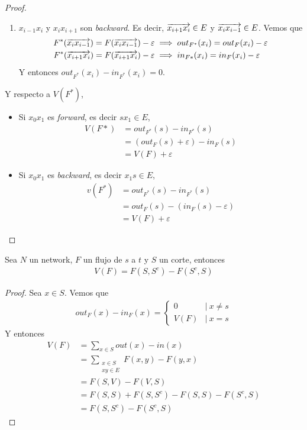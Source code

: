 \begin{proof}
\begin{itemize}
\begin{enumerate}
    \item $x_{i-1}x_i$ y $x_ix_{i+1}$ son \emph{backward}. Es decir,
      $\overrightarrow{x_{i+1} x_i} \in E$ y $\overrightarrow{x_i x_{i-1}} \in E$. Vemos que
      \begin{align}
        F^*(\overrightarrow{x_i x_{i-1}}) = F(\overrightarrow{x_i x_{i-1}}) - \varepsilon
        &\implies out_{F^*}(x_i) = out_F(x_i) - \varepsilon\\
        F^*(\overrightarrow{x_{i+1} x_i}) = F(\overrightarrow{x_{i+1} x_i}) - \varepsilon
        &\implies in_{F*} (x_i) = in_F(x_i) - \varepsilon
      \end{align}
      Y entonces $out_{F^*} (x_i) - in_{F^*}(x_i) = 0$.
    \end{enumerate}
  \end{itemize}

  Y respecto a $V(F^*)$,
  \begin{itemize}
    \item[] Si $x_0x_1$ es \emph{forward}, es decir $sx_1 \in E$,
    \begin{align}
      V(F*)
      &= out_{F^*}(s) - in_{F^*}(s)\\
      &= (out_F(s) + \varepsilon) - in_{F}(s)\\
      &= V(F) + \varepsilon
    \end{align}

    \item[] Si $x_0x_1$ es \emph{backward}, es decir $x_1s \in E$,
    \begin{align}
      v(F^*)
      &= out_{F^*}(s) - in_{F^*}(s)\\
      &= out_F(s) - (in_F(s) - \varepsilon)\\
      &= V(F) + \varepsilon
    \end{align}
  \end{itemize}
\end{proof}

\begin{lemma}
  Sea $N$ un network, $F$ un flujo de $s$ a $t$ y $S$ un corte, entonces
  \begin{align}
    V(F) = F(S, S^c) - F(S^c, S)
  \end{align}
\end{lemma}

\begin{proof}
  Sea $x \in S$. Vemos que
  \begin{align}
    out_F(x) - in_F(x) =
    \begin{cases}
      0 & |\ x \neq s\\
      V(F) & |\ x = s
    \end{cases}
  \end{align}
  Y entonces
  \begin{align}
    V(F)
    &= \sum_{x \in S} out(x) - in(x)\\
    &= \sum_{\substack{x \in S \\ xy \in E}} F(x,y) - F(y,x)\\
    &= F(S,V) - F(V,S)\\
    &= F(S,S) + F(S, S^c) - F(S,S) - F(S^c, S)\\
    &= F(S,S^c) - F(S^c, S)
  \end{align}
\end{proof}

